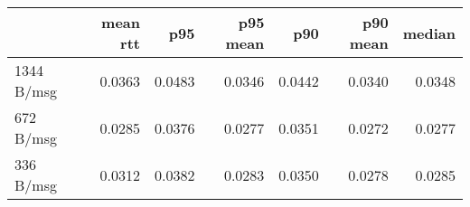 \begin{tabular}{l|rrrrrr}
\rowcolor{gray!50}
 & mean rtt & p95 & p95 mean & p90 & p90 mean & median\\\hline
1344 B/msg & 0.0363 & 0.0483 & 0.0346 & 0.0442 & 0.0340 & 0.0348 \\
672 B/msg & 0.0285 & 0.0376 & 0.0277 & 0.0351 & 0.0272 & 0.0277 \\
336 B/msg & 0.0312 & 0.0382 & 0.0283 & 0.0350 & 0.0278 & 0.0285 \\
\end{tabular}
